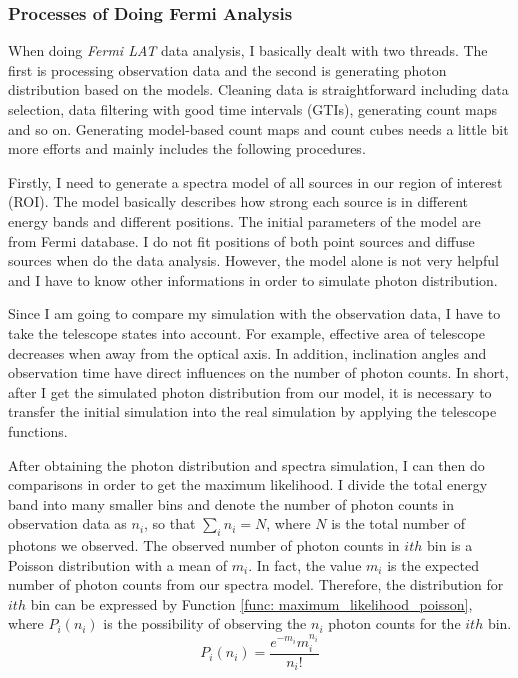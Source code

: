 \documentclass[12pt]{report}
\begin{document}
          \subsubsection{Processes of Doing Fermi Analysis}
          
            When doing \textit{Fermi LAT} data analysis, I basically dealt with two threads. The first is 
            processing observation data and the second is generating photon distribution based on 
            the models. Cleaning data is straightforward including data selection, data filtering with 
            good time intervals (GTIs), generating count maps and so on. Generating model-based count 
            maps and count cubes needs a little bit more efforts and mainly includes the following 
            procedures. 

            Firstly, I need to generate a spectra model of all sources in our region of interest (ROI).
            The model basically describes how strong each source is in different energy bands and 
            different positions. The initial parameters of the model are from Fermi database. I do not fit 
            positions of both point sources and diffuse sources when do the data analysis. 
            However, the model alone is not very helpful and I have to know other 
            informations in order to simulate photon distribution. 

            Since I am going to compare my simulation with the observation data, I have to 
            take the telescope states into account. For example, 
            effective area of telescope decreases when away from the optical axis. 
            In addition, inclination angles and observation time have direct influences on the 
            number of photon counts. In short, after I get the simulated photon distribution from 
            our model, it is necessary to transfer the initial simulation into the real simulation by
            applying the telescope functions. 
            
            After obtaining the photon distribution and spectra simulation, 
            I can then do comparisons in order to get 
            the maximum likelihood. I divide the total energy band into many smaller bins and denote
            the number of photon counts in observation data as $n_{i}$, so that $\sum_{i}^{}n_{i} = N$, 
            where $N$ is the total number of photons we observed. The observed number of photon counts
            in $ith$ bin is a Poisson distribution with a mean of $m_{i}$. In fact, the value $m_{i}$ is the 
            expected number of photon counts from our spectra model. Therefore, the distribution for $ith$
            bin can be expressed by Function \ref{func: maximum_likelihood_poisson}, where 
            $P_{i}\left(n_{i}\right)$ is the possibility of observing the $n_{i}$ photon counts for the $ith$
            bin. 
          \begin{equation}
            P_{i}\left(n_{i}\right) = \frac{e^{-m_{i}} m_{i}^{n_{i}}}{n_{i}!}
            \label{func: maximum_likelihood_poisson}
          \end{equation}
\end{document}

